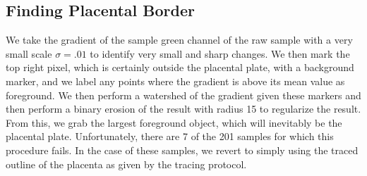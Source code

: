     
%    
    
    \subsection{Finding Placental Border}
		
		We take the gradient of the sample green channel of the raw sample with a very small scale $\sigma=.01$ to identify very small and sharp changes. We then mark the top right pixel, which is certainly outside the placental plate, with a background marker, and we label any points where the gradient is above its mean value as foreground. We then perform a watershed of the gradient given these markers and then perform a binary erosion of the result with radius 15 to regularize the result. From this, we grab the largest foreground object, which will inevitably be the placental
		plate. Unfortunately, there are 7 of the 201 samples for which this procedure fails. In the case of these samples, we revert to simply using the traced outline of the placenta as given by the tracing protocol.
		
